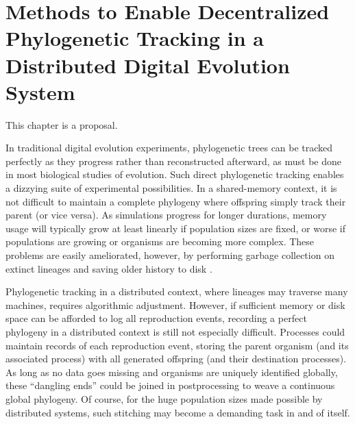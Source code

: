 \chapter{Methods to Enable Decentralized Phylogenetic Tracking in a Distributed Digital Evolution System}
\label{ch:distributed-phylogeny}

\noindent
This chapter is a proposal.

In traditional digital evolution experiments, phylogenetic trees can be tracked perfectly as they progress \citep{bohm2017mabe,wang2018vine,lalejini2019data} rather than reconstructed afterward, as must be done in most biological studies of evolution.
Such direct phylogenetic tracking enables a dizzying suite of experimental possibilities.
In a shared-memory context, it is not difficult to maintain a complete phylogeny where offspring simply track their parent (or vice versa).
As simulations progress for longer durations, memory usage will typically grow at least linearly if population sizes are fixed, or worse if populations are growing or organisms are becoming more complex.
These problems are easily ameliorated, however, by performing garbage collection on extinct lineages and saving older history to disk \citep{bohm2017mabe,dolson2019modes}.

Phylogenetic tracking in a distributed context, where lineages may traverse many machines, requires algorithmic adjustment.
However, if sufficient memory or disk space can be afforded to log all reproduction events, recording a perfect phylogeny in a distributed context is still not especially difficult.
Processes could maintain records of each reproduction event, storing the parent organism (and its associated process) with all generated offspring (and their destination processes).
As long as no data goes missing and organisms are uniquely identified globally, these ``dangling ends'' could be joined in postprocessing to weave a continuous global phylogeny.
Of course, for the huge population sizes made possible by distributed systems, such stitching may become a demanding task in and of itself.

